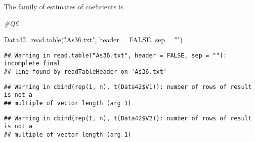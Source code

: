 \documentclass[
]{article}
\newenvironment{Shaded}{\begin{snugshade}}{\end{snugshade}}
\newcommand{\AttributeTok}[1]{\textcolor[rgb]{0.77,0.63,0.00}{#1}}
\newcommand{\CommentTok}[1]{\textcolor[rgb]{0.56,0.35,0.01}{\textit{#1}}}
\newcommand{\ConstantTok}[1]{\textcolor[rgb]{0.00,0.00,0.00}{#1}}
\newcommand{\DecValTok}[1]{\textcolor[rgb]{0.00,0.00,0.81}{#1}}
\newcommand{\FunctionTok}[1]{\textcolor[rgb]{0.00,0.00,0.00}{#1}}
\newcommand{\NormalTok}[1]{#1}
\newcommand{\OtherTok}[1]{\textcolor[rgb]{0.56,0.35,0.01}{#1}}
\newcommand{\SpecialCharTok}[1]{\textcolor[rgb]{0.00,0.00,0.00}{#1}}
\newcommand{\StringTok}[1]{\textcolor[rgb]{0.31,0.60,0.02}{#1}}
\begin{document}
The family of estimates of coeficients is

\begin{Shaded}
\begin{Highlighting}[]
\CommentTok{\#Q6}

\NormalTok{Data42}\OtherTok{=}\FunctionTok{read.table}\NormalTok{(}\StringTok{"As36.txt"}\NormalTok{, }\AttributeTok{header =} \ConstantTok{FALSE}\NormalTok{, }\AttributeTok{sep =} \StringTok{""}\NormalTok{) }
\end{Highlighting}
\end{Shaded}

\begin{verbatim}
## Warning in read.table("As36.txt", header = FALSE, sep = ""): incomplete final
## line found by readTableHeader on 'As36.txt'
\end{verbatim}

\begin{Shaded}
\end{Shaded}

\begin{verbatim}
## Warning in cbind(rep(1, n), t(Data42$V1)): number of rows of result is not a
## multiple of vector length (arg 1)
\end{verbatim}

\begin{Shaded}
\end{Shaded}

\begin{verbatim}
## Warning in cbind(rep(1, n), t(Data42$V2)): number of rows of result is not a
## multiple of vector length (arg 1)
\end{verbatim}

\begin{Shaded}
\end{Shaded}
\end{document}
